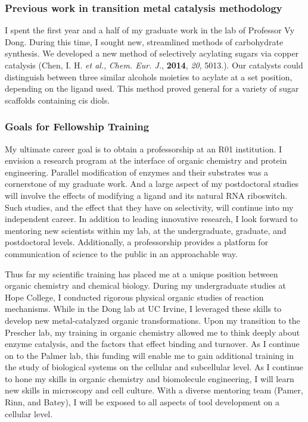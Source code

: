 \documentclass{F32}
\begin{document}
\subsubsection*{Previous work in transition metal catalysis methodology}
I spent the first year and a half of my graduate work in the lab of Professor Vy Dong. During this time, I sought new, streamlined methods of carbohydrate synthesis. We developed a new method of selectively acylating sugars via copper catalysis (Chen, I. H. \textit{et al.}, \textit{Chem. Eur. J.}, \textbf{2014}, \textit{20}, 5013.). Our catalysts could distinguish between three similar alcohols moieties to acylate at a set position, depending on the ligand used. This method proved general for a variety of sugar scaffolds containing cis diols.

\subsubsection*{Goals for Fellowship Training}
My ultimate career goal is to obtain a professorship at an R01 institution. I envision a research program at the interface of organic chemistry and protein engineering. Parallel modification of enzymes and their substrates was a cornerstone of my graduate work. And a large aspect of my postdoctoral studies will involve the effects of modifying a ligand and its natural RNA riboswitch. Such studies, and the effect that they have on selectivity, will continue into my independent career. In addition to leading innovative research, I look forward to mentoring new scientists within my lab, at the undergraduate, graduate, and postdoctoral levels. Additionally, a professorship provides a platform for communication of science to the public in an approachable way.

Thus far my scientific training has placed me at a unique position between organic chemistry and chemical biology. During my undergraduate studies at Hope College, I conducted rigorous physical organic studies of reaction mechanisms. While in the Dong lab at UC Irvine, I leveraged these skills to develop new metal-catalyzed organic transformations. Upon my transition to the Prescher lab, my training in organic chemistry allowed me to think deeply about enzyme catalysis, and the factors that effect binding and turnover. As I continue on to the Palmer lab, this funding will enable me to gain additional training in the study of biological systems on the cellular and subcellular level. As I continue to hone my skills in organic chemistry and biomolecule engineering, I will learn new skills in microscopy and cell culture. With a diverse mentoring team (Pamer, Rinn, and Batey), I will be exposed to all aspects of tool development on a cellular level.
\end{document}
